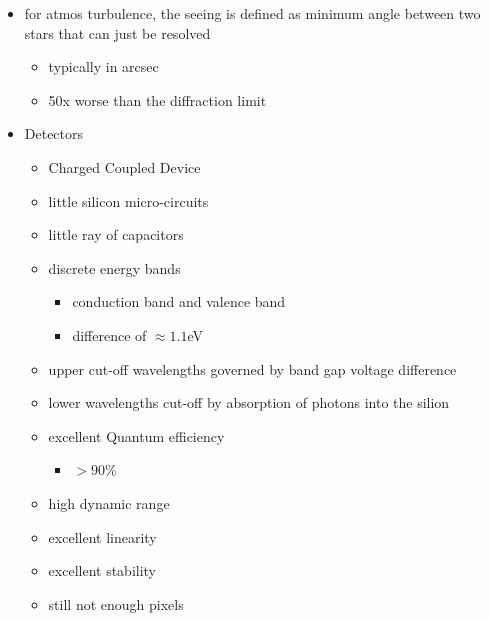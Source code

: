 \documentclass[a4paper,11pt,normalem]{article}
\begin{document}
\begin{itemize}
    \item for atmos turbulence, the seeing is defined as minimum angle between two stars that can just be resolved
        \begin{itemize}
            \item typically in arcsec
            \item 50x worse than the diffraction limit
        \end{itemize}
    \item Detectors
        \begin{itemize}
            \item Charged Coupled Device
            \item little silicon micro-circuits
            \item little ray of capacitors
            \item discrete energy bands
                \begin{itemize}
                    \item conduction band and valence band
                    \item difference of \(\approx 1.1\)eV
                \end{itemize}
            \item upper cut-off wavelengths governed by band gap voltage difference
            \item lower wavelengths cut-off by absorption of photons into the silion
            \item excellent Quantum efficiency
                \begin{itemize}
                    \item \(> 90\)\%
                \end{itemize}
            \item high dynamic range
            \item excellent linearity
            \item excellent stability
            \item still not enough pixels
        \end{itemize}
\end{itemize}

\section{}
\end{document}
